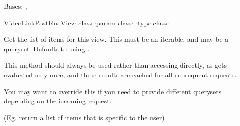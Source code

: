 \documentclass[letterpaper,10pt,english]{sphinxmanual}
\begin{document}
\begin{fulllineitems}
\label{\detokenize{vtcvlp:vtcuser.views.VideoLinkAPIView}}
Bases: , 

VideoLinkPostRudView class
:param class: 
:type class: 

\begin{fulllineitems}
\label{\detokenize{vtcvlp:vtcuser.views.VideoLinkAPIView.authentication_classes}}
\end{fulllineitems}


\begin{fulllineitems}
\label{\detokenize{vtcvlp:vtcuser.views.VideoLinkAPIView.get_queryset}}
Get the list of items for this view.
This must be an iterable, and may be a queryset.
Defaults to using .

This method should always be used rather than accessing 
directly, as  gets evaluated only once, and those results
are cached for all subsequent requests.

You may want to override this if you need to provide different
querysets depending on the incoming request.

(Eg. return a list of items that is specific to the user)

\end{fulllineitems}



\end{fulllineitems}
\end{document}

